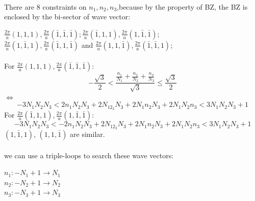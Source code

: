\documentclass{article}
\begin{document}
\paragraph*{}
There are 8 constraints on $n_1,n_2,n_3$,because by the property of BZ, the BZ is enclosed by the bi-sector of wave vector:\\
\begin{center}
$\frac{2\pi}{a}(1,1,1),\frac{2\pi}{a}(\bar{1},\bar{1},\bar{1});\frac{2\pi}{a}(\bar{1},1,1),\frac{2\pi}{a}(1,\bar{1},\bar{1});$\\
$\frac{2\pi}{a}(1,\bar{1},1),\frac{2\pi}{a}(\bar{1},1,\bar{1})
$ and $\frac{2\pi}{a}(1,1,\bar{1}),\frac{2\pi}{a}(\bar{1},\bar{1},1);$\\
\end{center}

\paragraph*{}
For $\frac{2\pi}{a}(1,1,1),\frac{2\pi}{a}(\bar{1},\bar{1},\bar{1})$:
\begin{equation*}
-\frac{\sqrt{3}}{2}<\frac{\frac{n_1}{N_1}+\frac{n_2}{N_2}+\frac{n_3}{N_3}}{\sqrt{3}}\leq\frac{\sqrt{3}}{2}
\end{equation*}
$\Longleftrightarrow$
\begin{equation*}
-3N_1N_2N_3<2n_1N_2N_3+2N_12_2N_3+2N_1n_2N_3+2N_1N_2n_3< 3N_1N_2N_3+1
\end{equation*}
For $\frac{2\pi}{a}(\bar{1},1,1),\frac{2\pi}{a}(1,\bar{1},\bar{1})$:
\begin{equation*}
-3N_1N_2N_3<-2n_1N_2N_3+2N_12_2N_3+2N_1n_2N_3+2N_1N_2n_3< 3N_1N_2N_3+1
\end{equation*}
$(1,\bar{1},1)$, $(1,1,\bar{1})$ are similar.
\paragraph*{}
we can use a triple-loops to search these wave vectors:\\
\begin{center}
$n_1:-N_1+1\rightarrow N_1$ \\
$n_2:-N_2+1\rightarrow N_2$ \\
$n_3:-N_3+1\rightarrow N_3$ 
\end{center}
\end{document}
